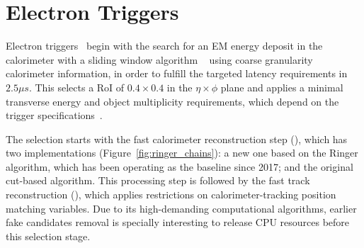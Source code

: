 \section{Electron Triggers}\label{ssec:egamma_trigger}


Electron triggers~\cite{aad2020performance} begin with
the search for an EM energy deposit in the calorimeter with a \licalo{} sliding
window algorithm ~\cite{Franchino:2730851} using coarse granularity calorimeter information, in order to
fulfill the targeted latency requirements in $2.5\mu s$. This selects a RoI of $0.4\times 0.4$
in the $\eta\times\phi$ plane and applies a minimal transverse energy and object
multiplicity requirements, which depend on the trigger
specifications~\cite{TRIG-2016-01}.
 
The \hlt{} selection starts with the fast calorimeter reconstruction
step (\fastcalo), which has two implementations
(Figure~\ref{fig:ringer_chains}): a new one based on the Ringer algorithm, which
has been operating as the baseline since 2017; and the original cut-based
algorithm.%
This processing step is followed by the fast track reconstruction
(\fastelectron), which applies restrictions on calorimeter-tracking position
matching variables. Due to its high-demanding computational algorithms, earlier
 fake candidates removal is specially
interesting to release CPU resources before this selection stage.


